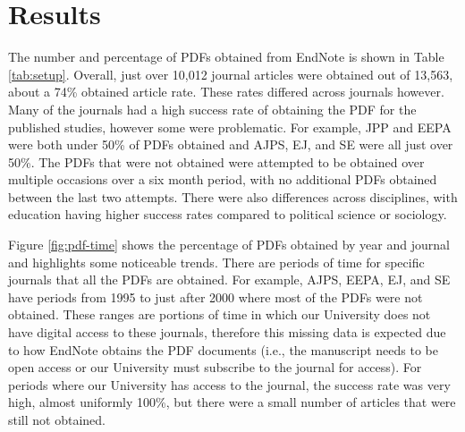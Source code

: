 \documentclass[
  english,
  ,man]{apa6}
\begin{document}
\hypertarget{results}{%
\section{Results}\label{results}}

The number and percentage of PDFs obtained from EndNote is shown in Table \ref{tab:setup}. Overall, just over 10,012 journal articles were obtained out of 13,563, about a 74\% obtained article rate. These rates differed across journals however. Many of the journals had a high success rate of obtaining the PDF for the published studies, however some were problematic. For example, JPP and EEPA were both under 50\% of PDFs obtained and AJPS, EJ, and SE were all just over 50\%. The PDFs that were not obtained were attempted to be obtained over multiple occasions over a six month period, with no additional PDFs obtained between the last two attempts. There were also differences across disciplines, with education having higher success rates compared to political science or sociology.

Figure \ref{fig:pdf-time} shows the percentage of PDFs obtained by year and journal and highlights some noticeable trends. There are periods of time for specific journals that all the PDFs are obtained. For example, AJPS, EEPA, EJ, and SE have periods from 1995 to just after 2000 where most of the PDFs were not obtained. These ranges are portions of time in which our University does not have digital access to these journals, therefore this missing data is expected due to how EndNote obtains the PDF documents (i.e., the manuscript needs to be open access or our University must subscribe to the journal for access). For periods where our University has access to the journal, the success rate was very high, almost uniformly 100\%, but there were a small number of articles that were still not obtained.
\end{document}
